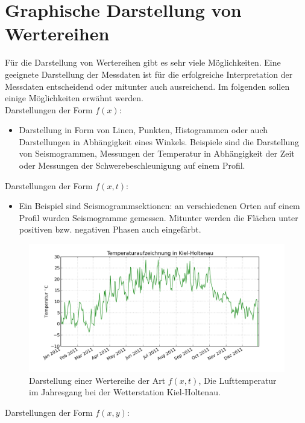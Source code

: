 \newpage


\section{Graphische Darstellung von Wertereihen}
Für die Darstellung von Wertereihen gibt es sehr viele Möglichkeiten. Eine geeignete Darstellung der Messdaten ist für die erfolgreiche Interpretation der Messdaten entscheidend oder mitunter auch ausreichend. Im folgenden sollen einige Möglichkeiten erwähnt werden.\\[.5cm]
Darstellungen der Form $f(x)$:
\begin{itemize}
    \item Darstellung in Form von Linen, Punkten, Histogrammen oder auch Darstellungen in Abhängigkeit eines Winkels. Beispiele sind die Darstellung von Seismogrammen, Messungen der Temperatur in Abhängigkeit der Zeit oder Messungen der Schwerebeschleunigung auf einem Profil. 
  \end{itemize}
  Darstellungen der Form  $f(x,t)$: 
\begin{itemize}
\item
Ein Beispiel sind Seismogrammsektionen: an verschiedenen Orten auf einem Profil wurden Seismogramme gemessen. Mitunter werden die Flächen unter positiven bzw. negativen Phasen auch eingefärbt.
\end{itemize}
  \begin{figure}[h!]
  \centering
  \includegraphics[width=.9\tw]{fig/03-Example-illustations/temperature-diagram_kiel}
  \caption{Darstellung einer Wertereihe der Art $f(x, t)$, Die Lufttemperatur im Jahresgang bei der Wetterstation Kiel-Holtenau.}
  \end{figure}
Darstellungen der Form $f(x,y)$:
